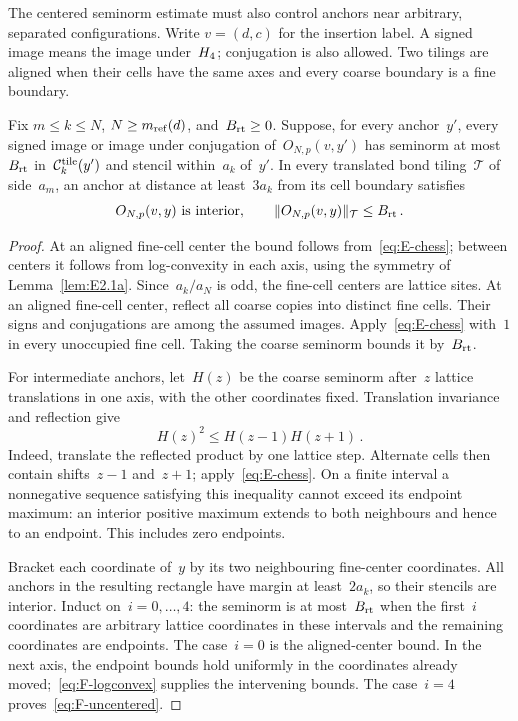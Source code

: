The centered seminorm estimate must also control anchors near arbitrary, separated configurations. Write $v=(d,c)$ for the insertion label.
A signed image means the image under~$H_4$; conjugation is also allowed. Two tilings are aligned when their cells have the same axes and every coarse boundary is a fine boundary.
\begin{lemma}\label{lem:F1a}
Fix $m\le k\le N$, $N\ge m_{\mathrm{ref}}(d)$, and~$B_{\rm rt}\ge0$. Suppose, for every anchor~$y'$, every signed image or image under conjugation of~$O_{N,p}(v,y')$ has seminorm at most~$B_{\rm rt}$ in~$\mathcal C^{\rm tile}_k(y')$ and stencil within~$a_k$ of~$y'$. In every translated bond tiling~$\mathcal T$ of side~$a_m$, an anchor at distance at least~$3a_k$ from its cell boundary satisfies
\begin{equation}\label{eq:F-uncentered}
O_{N,p}(v,y)\text{ is interior},\qquad
\|O_{N,p}(v,y)\|_{\mathcal T}\le B_{\rm rt}\,.
\end{equation}
\end{lemma}
\begin{proof}
At an aligned fine-cell center the bound follows from~\eqref{eq:E-chess}; between centers it follows from log-convexity in each axis, using the symmetry of Lemma~\ref{lem:E2.1a}. Since~$a_k/a_N$ is odd, the fine-cell centers are lattice sites. At an aligned fine-cell center, reflect all coarse copies into distinct fine cells. Their signs and conjugations are among the assumed images. Apply~\eqref{eq:E-chess} with~$1$ in every unoccupied fine cell. Taking the coarse seminorm bounds it by~$B_{\rm rt}$.

For intermediate anchors, let~$H(z)$ be the coarse seminorm after~$z$ lattice translations in one axis, with the other coordinates fixed. Translation invariance and reflection give
\begin{equation}\label{eq:F-logconvex}
H(z)^2\le H(z-1)H(z+1)\,.
\end{equation}
Indeed, translate the reflected product by one lattice step. Alternate cells then contain shifts~$z-1$ and~$z+1$; apply~\eqref{eq:E-chess}. On a finite interval a nonnegative sequence satisfying this inequality cannot exceed its endpoint maximum: an interior positive maximum extends to both neighbours and hence to an endpoint. This includes zero endpoints.

Bracket each coordinate of~$y$ by its two neighbouring fine-center coordinates. All anchors in the resulting rectangle have margin at least~$2a_k$, so their stencils are interior. Induct on~$i=0,\ldots,4$: the seminorm is at most~$B_{\rm rt}$ when the first~$i$ coordinates are arbitrary lattice coordinates in these intervals and the remaining coordinates are endpoints. The case~$i=0$ is the aligned-center bound. In the next axis, the endpoint bounds hold uniformly in the coordinates already moved;~\eqref{eq:F-logconvex} supplies the intervening bounds. The case~$i=4$ proves~\eqref{eq:F-uncentered}.
\end{proof}

